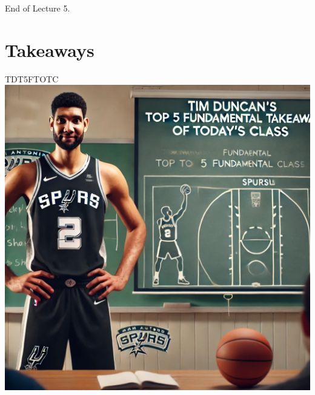 \documentclass[aspectratio=169]{beamer}
\begin{document}

\begin{frame}{}
    \centering
    \Huge End of Lecture 5.
\end{frame}

\section*{Takeaways}

\begin{frame}{TDT5FTOTC}
    \centering
    \includegraphics[height=0.9\textheight]{figures/tim.png}
\end{frame}
\end{document}
